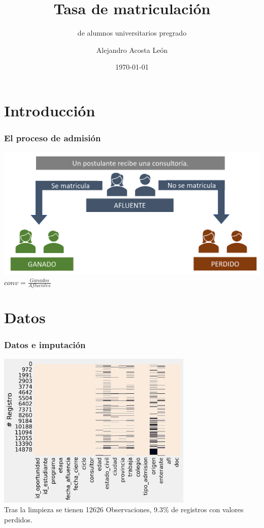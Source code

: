\documentclass[aspectratio=149]{beamer}
\title{Tasa de matriculación }
\subtitle{de alumnos universitarios pregrado}
\author{Alejandro Acosta León}
\date{\today}
\begin{document}
\maketitle

\section{Introducción}
\begin{frame}
	\frametitle{El proceso de admisión}
	\centering
	\includegraphics[width=\textwidth]{intro.png} \\
	\vspace{0.3cm}
	$conv = \frac{Ganados}{Afluentes}$
\end{frame}

\section{Datos}
\begin{frame}
	\frametitle{Datos e imputación}
	\centering
	\includegraphics[width=0.70\textwidth]{missings.png} \\
	Tras la limpieza se tienen 12626 Observaciones, 9.3\% de registros con valores perdidos.
\end{frame}
\end{document}
